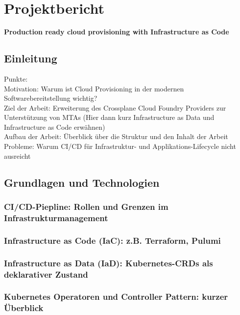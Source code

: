 %
%

\section{Projektbericht}

\begin{center}
    \large
    \textbf{Production ready cloud provisioning with Infrastructure as Code}
\end{center}

\subsection{Einleitung}
Punkte: \\
Motivation: Warum ist Cloud Provisioning in der modernen Softwarebereitstellung wichtig? \\
Ziel der Arbeit: Erweiterung des Crossplane Cloud Foundry Providers zur Unterstützung von MTAs
(Hier dann kurz Infrastructure as Data und Infrastructure as Code erwähnen) \\
Aufbau der Arbeit: Überblick über die Struktur und den Inhalt der Arbeit \\
Probleme: Warum CI/CD für Infrastruktur- und Applikations-Lifecycle nicht ausreicht\cite{lustigeCitation}

\subsection{Grundlagen und Technologien}

\subsubsection{CI/CD-Piepline: Rollen und Grenzen im Infrastrukturmanagement}

\subsubsection{Infrastructure as Code (IaC): z.B. Terraform, Pulumi}

\subsubsection{Infrastructure as Data (IaD): Kubernetes-CRDs als deklarativer Zustand}

\subsubsection{Kubernetes Operatoren und Controller Pattern: kurzer Überblick}

